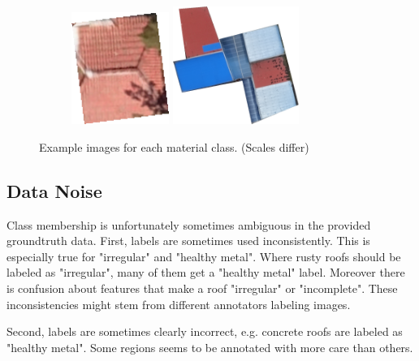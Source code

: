 \documentclass[11pt]{article}
\begin{document}
\begin{figure}
\begin{subfigure}[c]{0.32\textwidth}
		\end{subfigure}
		\begin{subfigure}[c]{0.32\textwidth}
			\centering
			\includegraphics[width=0.35\textwidth]{figures/mat_examples/other1.png}		
			\includegraphics[width=0.45\textwidth]{figures/mat_examples/other2.png}
		\end{subfigure}
	\caption{Example images for each material class. (Scales differ)}
	\label{fig:mat_examples}
	\end{figure}

	\subsection{Data Noise}
	
	Class membership is unfortunately sometimes ambiguous in the provided groundtruth data. 
	First, labels are sometimes used inconsistently. This is especially true for "irregular" and "healthy metal". Where rusty roofs should be labeled as "irregular", many of them get a "healthy metal" label.
	Moreover there is confusion about features that make a roof "irregular" or "incomplete".
	These inconsistencies might stem from different annotators labeling images.
	
	Second, labels are sometimes clearly incorrect, e.g. concrete roofs are labeled as "healthy metal". Some regions seems to be annotated with more care than others. 
	
\end{document}
